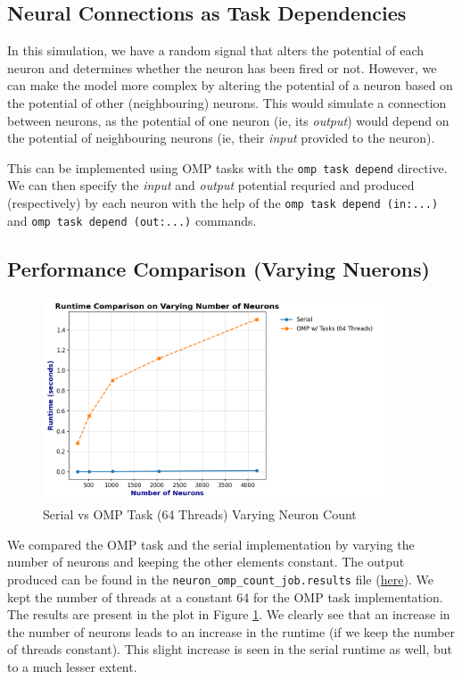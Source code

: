 \documentclass[a4paper,10pt]{article}
\begin{document}
\subsection{Neural Connections as Task Dependencies}
In this simulation, we have a random signal that alters the potential of each neuron and determines whether the neuron has been fired or not. However, we can make the model more complex by altering the potential of a neuron based on the potential of other (neighbouring) neurons. This would simulate a connection between neurons, as the potential of one neuron (ie, its \textit{output}) would depend on the potential of neighbouring neurons (ie, their \textit{input} provided to the neuron). 

This can be implemented using OMP tasks with the \verb|omp task depend| directive. We can then specify the \textit{input} and \textit{output} potential requried and produced (respectively) by each neuron with the help of the \verb|omp task depend (in:...)| and \verb|omp task depend (out:...)| commands.   

\subsection{Performance Comparison (Varying Nuerons)}
\begin{figure}[H]
  \centering
  \includegraphics[width=0.9\textwidth]{img/bonus/neuron_variation.png}
  \caption{Serial vs OMP Task (64 Threads) Varying Neuron Count}
  \label{fig:bonus_neuron}
\end{figure}

We compared the OMP task and the serial implementation by varying the number of neurons and keeping the other elements constant. The output produced can be found in the \verb|neuron_omp_count_job.results| file (\href{https://github.com/paulmyr/DD2356-MethodsHPC/blob/master/3_open_mp/bonus/neuron/outputs/neuron_omp_count_job.results}{here}). We kept the number of threads at a constant 64 for the OMP task implementation. The results are present in the plot in Figure \ref{fig:bonus_neuron}. We clearly see that an increase in the number of neurons leads to an increase in the runtime (if we keep the number of threads constant). This slight increase is seen in the serial runtime as well, but to a much lesser extent.
\end{document}
